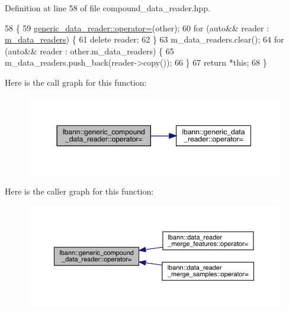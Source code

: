 Definition at line 58 of file compound\+\_\+data\+\_\+reader.\+hpp.


\begin{DoxyCode}
58                                                                                      \{
59     \hyperlink{classlbann_1_1generic__data__reader_aec7e626e6efa2a4bf23f931e2ef8f607}{generic\_data\_reader::operator=}(other);
60     \textcolor{keywordflow}{for} (\textcolor{keyword}{auto}&& reader : \hyperlink{classlbann_1_1generic__compound__data__reader_a9815e94ade5873415fd766e09d956d5b}{m\_data\_readers}) \{
61       \textcolor{keyword}{delete} reader;
62     \}
63     m\_data\_readers.clear();
64     \textcolor{keywordflow}{for} (\textcolor{keyword}{auto}&& reader : other.m\_data\_readers) \{
65       m\_data\_readers.push\_back(reader->copy());
66     \}
67     \textcolor{keywordflow}{return} *\textcolor{keyword}{this};
68   \}
\end{DoxyCode}
Here is the call graph for this function\+:\nopagebreak
\begin{figure}[H]
\begin{center}
\leavevmode
\includegraphics[width=350pt]{classlbann_1_1generic__compound__data__reader_a7ece97b6fd2bc62da4d98f29cfb50155_cgraph}
\end{center}
\end{figure}
Here is the caller graph for this function\+:\nopagebreak
\begin{figure}[H]
\begin{center}
\leavevmode
\includegraphics[width=350pt]{classlbann_1_1generic__compound__data__reader_a7ece97b6fd2bc62da4d98f29cfb50155_icgraph}
\end{center}
\end{figure}
\mbox{\label{classlbann_1_1generic__compound__data__reader_ae703ef84ca1c77221f4724a799f9ad0d}} 
